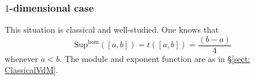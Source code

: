 \documentclass[a4paper,10pt]{amsart}
\theoremstyle{definition}
\theoremstyle{remark}
\numberwithin{equation}{section}
\newcommand{\R}{\mathbb R}
\newcommand{\ts}{\mathrm{Sup}}
\newcommand{\0}{\color{blue}{\mathsf{0}}}
\begin{document}
    \subsubsection{$1$-dimensional case} This situation is classical and well-studied. One knows that 
    \begin{equation} \label{eqn:supinterval}   \ts^{\hom}([a,b])= t([a,b]) =   \frac{(b-a)}{4}\end{equation}
    whenever  $a<b$.  The module and exponent function are as in \S\ref{sect: ClassicalVdM}.
  
  


  
  
\end{document}
